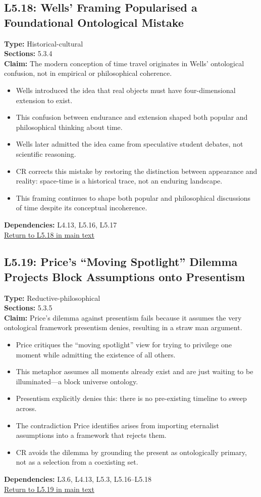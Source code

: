 \documentclass[12pt]{book}
\newcommand{\returnlink}[1]{\hyperref[logic:#1]{Return to #1 in main text}\xspace}
\begin{document}
\subsection*{L5.18: Wells' Framing Popularised a Foundational Ontological Mistake}
\label{appendix:L5.18}
\textbf{Type:} Historical-cultural \\
\textbf{Sections:} 5.3.4 \\
\textbf{Claim:} The modern conception of time travel originates in Wells' ontological confusion, not in empirical or philosophical coherence.
\begin{itemize}
  \item Wells introduced the idea that real objects must have four-dimensional extension to exist.
  \item This confusion between endurance and extension shaped both popular and philosophical thinking about time.
  \item Wells later admitted the idea came from speculative student debates, not scientific reasoning.
  \item CR corrects this mistake by restoring the distinction between appearance and reality: space-time is a historical trace, not an enduring landscape.
  \item This framing continues to shape both popular and philosophical discussions of time despite its conceptual incoherence.
\end{itemize}
\textbf{Dependencies:} L4.13, L5.16, L5.17 \\
\returnlink{L5.18}

\subsection*{L5.19: Price's ``Moving Spotlight'' Dilemma Projects Block Assumptions onto Presentism}
\label{appendix:L5.19}
\textbf{Type:} Reductive-philosophical \\
\textbf{Sections:} 5.3.5 \\
\textbf{Claim:} Price's dilemma against presentism fails because it assumes the very ontological framework presentism denies, resulting in a straw man argument.
\begin{itemize}
  \item Price critiques the ``moving spotlight'' view for trying to privilege one moment while admitting the existence of all others.
  \item This metaphor assumes all moments already exist and are just waiting to be illuminated---a block universe ontology.
  \item Presentism explicitly denies this: there is no pre-existing timeline to sweep across.
  \item The contradiction Price identifies arises from importing eternalist assumptions into a framework that rejects them.
  \item CR avoids the dilemma by grounding the present as ontologically primary, not as a selection from a coexisting set.
\end{itemize}
\textbf{Dependencies:} L3.6, L4.13, L5.3, L5.16–L5.18 \\
\returnlink{L5.19}
\end{document}
